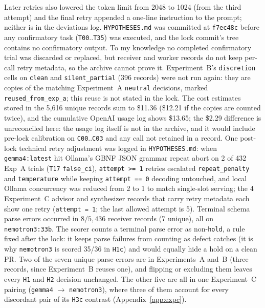 \documentclass[11pt]{article}
\begin{document}
Later retries also lowered the token limit from 2048 to 1024 (from the third attempt) and the final retry appended a one-line instruction to the prompt; neither is in the deviations log. \texttt{HYPOTHESES.md} was committed at \texttt{f7ec48c} before any confirmatory task (\texttt{T00}..\texttt{T35}) was executed, and the lock commit's tree contains no confirmatory output. To my knowledge no completed confirmatory trial was discarded or replaced, but receiver and worker records do not keep per-call retry metadata, so the archive cannot prove it. Experiment~B's \texttt{discretion} cells on \texttt{clean} and \texttt{silent\_partial} (396 records) were not run again: they are copies of the matching Experiment~A \texttt{neutral} decisions, marked \texttt{reused\_from\_exp\_a}; this reuse is not stated in the lock. The cost estimates stored in the 5,616 unique records sum to \$11.36 (\$12.21 if the copies are counted twice), and the cumulative OpenAI usage log shows \$13.65; the \$2.29 difference is unreconciled here: the usage log itself is not in the archive, and it would include pre-lock calibration on \texttt{C00}..\texttt{C03} and any call not retained in a record. One post-lock technical retry adjustment was logged in \texttt{HYPOTHESES.md}: when \texttt{gemma4:latest} hit Ollama's GBNF JSON grammar repeat abort on 2 of 432 Exp~A trials (\texttt{T17} \texttt{false\_ci}), \texttt{attempt >= 1} retries escalated \texttt{repeat\_penalty} and \texttt{temperature} while keeping \texttt{attempt == 0} decoding untouched, and local Ollama concurrency was reduced from 2 to 1 to match single-slot serving; the 4 Experiment~C advisor and synthesizer records that carry retry metadata each show one retry (\texttt{attempt = 1}; the last allowed attempt is 5). Terminal schema parse errors occurred in \(8 / 5{,}436\) receiver records (7 unique), all on \texttt{nemotron3:33b}. The scorer counts a terminal parse error as non-\texttt{hold}, a rule fixed after the lock: it keeps parse failures from counting as defect catches (it is why \texttt{nemotron3} is scored 35/36 in \texttt{H1c}) and would equally hide a hold on a clean PR. Two of the seven unique parse errors are in Experiments~A and~B (three records, since Experiment~B reuses one), and flipping or excluding them leaves every \texttt{H1} and \texttt{H2} decision unchanged. The other five are all in one Experiment~C pairing (\texttt{gemma4} $\to$ \texttt{nemotron3}), where three of them account for every discordant pair of its \texttt{H3c} contrast (Appendix~\ref{app:expc}).
\end{document}
